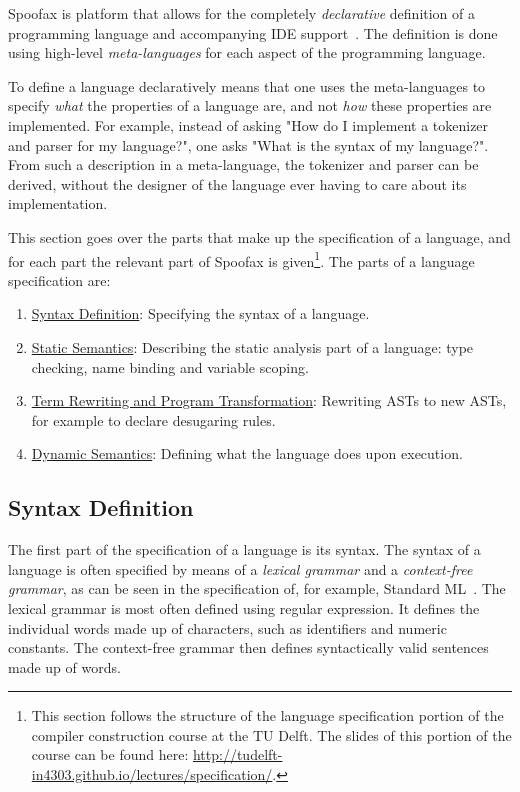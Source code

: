 Spoofax is platform that allows for the completely \emph{declarative}
definition of a programming language and accompanying IDE
support~\cite{Kats10a}. The definition is done using high-level
\emph{meta-languages} for each aspect of the programming language.

To define a language declaratively means that one uses the
meta-languages to specify \emph{what} the properties of a language are, and
not \emph{how} these properties are implemented. For example, instead of
asking "How do I implement a tokenizer and parser for my language?",
one asks "What is the syntax of my language?". From such a description
in a meta-language, the tokenizer and parser can be derived, without
the designer of the language ever having to care about its
implementation.

This section goes over the parts that make up the specification of a
language, and for each part the relevant part of Spoofax is
given\footnote{This section follows the structure of the
language specification portion of the compiler construction course at
the TU Delft. The slides of this portion of the course can be found
here: \url{http://tudelft-in4303.github.io/lectures/specification/}.}. The
parts of a language specification are:
\begin{enumerate}
\item \hyperref[sec-syntax-def]{Syntax Definition}: Specifying the syntax of a language.
\item \hyperref[sec-static-analysis]{Static Semantics}: Describing the static analysis part of a
language: type checking, name binding and variable scoping.
\item \hyperref[sec-term-rewrite]{Term Rewriting and Program Transformation}: Rewriting ASTs to new
ASTs, for example to declare desugaring rules.
\item \hyperref[sec-dynamic-semantics]{Dynamic Semantics}: Defining what the language does upon execution.
\end{enumerate}

\subsection{Syntax Definition}
\label{sec-syntax-def}
The first part of the specification of a language is its syntax. The
syntax of a language is often specified by means of a \emph{lexical
grammar} and a \emph{context-free grammar}, as can be seen in the
specification of, for example, Standard ML~\cite{Milner97}. The
lexical grammar is most often defined using regular expression. It
defines the individual words made up of characters, such as
identifiers and numeric constants. The context-free grammar then
defines syntactically valid sentences made up of words.

